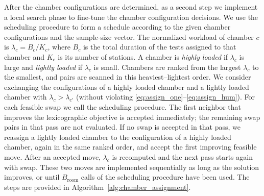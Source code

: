 \documentclass[11pt]{article}
\begin{document}
After the chamber configurations are determined, as a second step we implement a local search phase to fine-tune the chamber configuration decisions. We use the scheduling procedure to form a schedule according to the given chamber configurations and the sample-size vector. The normalized workload of chamber \(c\) is \(\lambda_c=B_c/K_c\), where \(B_c\) is the total duration of the tests assigned to that chamber and \(K_c\) is its number of stations. A chamber is \emph{highly loaded} if \(\lambda_c\) is large and \emph{lightly loaded} if \(\lambda_c\) is small. Chambers are ranked from the largest \(\lambda_c\) to the smallest, and pairs are scanned in this heaviest--lightest order. We consider exchanging the configurations of a highly loaded chamber and a lightly loaded chamber with \(\lambda_c>\lambda_{c'}\) (without violating \eqref{eq:assign_one}--\eqref{eq:assign_hum}). For each feasible swap we call the scheduling procedure. The first neighbor that improves the lexicographic objective is accepted immediately; the remaining swap pairs in that pass are not evaluated. If no swap is accepted in that pass, we reassign a lightly loaded chamber to the configuration of a highly loaded chamber, again in the same ranked order, and accept the first improving feasible move. After an accepted move, \(\lambda_c\) is recomputed and the next pass starts again with swap. These two moves are implemented sequentially as long as the solution improves, or until \(B_{\mathrm{room}}\) calls of the scheduling procedure have been used. The steps are provided in Algorithm~\ref{alg:chamber_assignment}.
\end{document}
